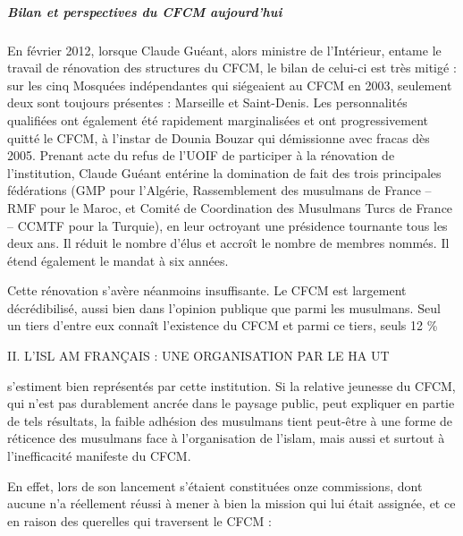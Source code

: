 \hypertarget{bilan-et-perspectives-du-cfcm-aujourdhui}{%
\subparagraph{Bilan et perspectives du CFCM
aujourd'hui}\label{bilan-et-perspectives-du-cfcm-aujourdhui}}


En février 2012, lorsque Claude Guéant, alors ministre de l'Intérieur,
entame le travail de rénovation des structures du CFCM, le bilan de
celui-ci est très mitigé : sur les cinq Mosquées indépendantes qui
siégeaient au CFCM en 2003, seulement deux sont toujours présentes :
Marseille et Saint-Denis. Les personnalités qualifiées ont également été
rapidement marginalisées et ont progressivement quitté le CFCM, à
l'instar de Dounia Bouzar qui démissionne avec fracas dès 2005. Prenant
acte du refus de l'UOIF de participer à la rénovation de l'institution,
Claude Guéant entérine la domination de fait des trois principales
fédérations (GMP pour l'Algérie, Rassemblement des musulmans de France
-- RMF pour le Maroc, et Comité de Coordination des Musulmans Turcs de
France -- CCMTF pour la Turquie), en leur octroyant une présidence
tournante tous les deux ans. Il réduit le nombre d'élus et accroît le
nombre de membres nommés. Il étend également le mandat à six années.

Cette rénovation s'avère néanmoins insuffisante. Le CFCM est largement
décrédibilisé, aussi bien dans l'opinion publique que parmi les
musulmans. Seul un tiers d'entre eux connaît l'existence du CFCM et
parmi ce tiers, seuls 12 \%

II. L'ISL AM FRANÇAIS : UNE ORGANISATION PAR LE HA UT

s'estiment bien représentés par cette institution. Si la relative
jeunesse du CFCM, qui n'est pas durablement ancrée dans le paysage
public, peut expliquer en partie de tels résultats, la faible adhésion
des musulmans tient peut-être à une forme de réticence des musulmans
face à l'organisation de l'islam, mais aussi et surtout à l'inefficacité
manifeste du CFCM.

En effet, lors de son lancement s'étaient constituées onze commissions,
dont aucune n'a réellement réussi à mener à bien la mission qui lui
était assignée, et ce en raison des querelles qui traversent le CFCM :



